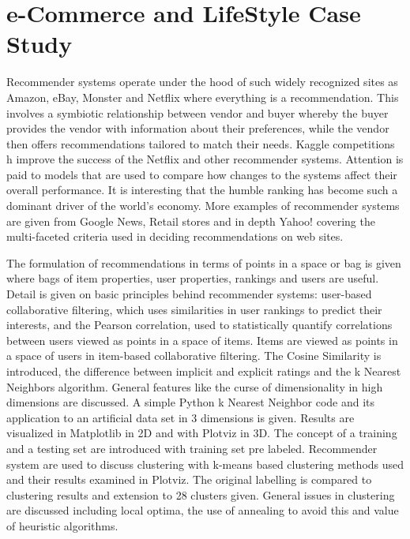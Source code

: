 

\section{e-Commerce and LifeStyle Case
Study}\label{e-commerce-and-lifestyle-case-study}

\FILENAME

Recommender systems operate under the hood of such widely recognized
sites as Amazon, eBay, Monster and Netflix where everything is a
recommendation. This involves a symbiotic relationship between vendor
and buyer whereby the buyer provides the vendor with information about
their preferences, while the vendor then offers recommendations tailored
to match their needs. Kaggle competitions h improve the success of the
Netflix and other recommender systems. Attention is paid to models that
are used to compare how changes to the systems affect their overall
performance. It is interesting that the humble ranking has become such a
dominant driver of the world's economy. More examples of recommender
systems are given from Google News, Retail stores and in depth Yahoo!
covering the multi-faceted criteria used in deciding recommendations on
web sites.

The formulation of recommendations in terms of points in a space or bag
is given where bags of item properties, user properties, rankings and
users are useful. Detail is given on basic principles behind recommender
systems: user-based collaborative filtering, which uses similarities in
user rankings to predict their interests, and the Pearson correlation,
used to statistically quantify correlations between users viewed as
points in a space of items. Items are viewed as points in a space of
users in item-based collaborative filtering. The Cosine Similarity is
introduced, the difference between implicit and explicit ratings and the
k Nearest Neighbors algorithm. General features like the curse of
dimensionality in high dimensions are discussed. A simple Python k
Nearest Neighbor code and its application to an artificial data set in 3
dimensions is given. Results are visualized in Matplotlib in 2D and with
Plotviz in 3D. The concept of a training and a testing set are
introduced with training set pre labeled. Recommender system are used to
discuss clustering with k-means based clustering methods used and their
results examined in Plotviz. The original labelling is compared to
clustering results and extension to 28 clusters given. General issues in
clustering are discussed including local optima, the use of annealing to
avoid this and value of heuristic algorithms.

